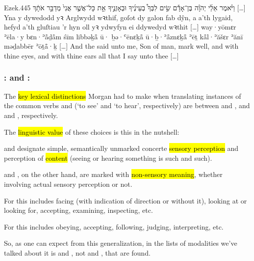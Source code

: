 \begin{example}{Ezek.}{44}{5}{}{}
	\quoling
	{וַיֹּ֨אמֶר אֵלַ֜י יְהֹוָ֗ה בֶּן־אָדָ֡ם שִׂ֣ים לִבְּךָ֩  בְעֵינֶ֜יךָ וּבְאָזְנֶ֣יךָ  אֵ֣ת כָּל־אֲשֶׁ֤ר אֲנִי֙ מְדַבֵּ֣ר אֹתָ֔ךְ […]}
	{Yna y dywedodd yꝛ Arglwydd wꝛthif, goſot dy galon fab dŷn, a  a’th lygaid,  hefyd a’th gluſtiau ’r hyn oll yꝛ ydwyfyn ei ddywedyd wꝛthit […]}
	{way·yōmɛr ʾēla·y {\YHWH} bɛn·ʾå̄ḏå̄m śīm libbəḵå̄ ū· ḇə·ʿēnɛḵå̄ ū·ḇ·ʾå̄znɛḵå̄  ʾēṯ kå̄l·ʾăšɛr ʾănī məḏabbēr ʾōṯå̄·ḵ […]}
	{And the {\LORD} said unto me, Son of man, mark well, and  with thine eyes, and  with thine ears all that I say unto thee […]}
\end{example}



\subsubsection{: and :}

\begin{paper}
	{\click} The \hl{key lexical distinctions} Morgan had to make when translating instances of the common verbs  and  (‘to see’ and ‘to hear’, respectively) are between  and , and  and , respectively.

	{\click} The \hl{linguistic value} of these choices is this in the nutshell:
	\begin{compactitem}
		\item {} and  designate simple, semantically unmarked concerte \hl{sensory perception} and perception of \hl{content} (seeing or hearing something is such and such).%
		\item {} and , on the other hand, are marked with \hl{non-sensory meaning}, whether involving actual sensory perception or not.
			\begin{compactitem}
				\item For  this includes facing (with indication of direction or without it), looking at or looking for, accepting, examining, inspecting, etc.
				\item For  this includes obeying, accepting, following, judging, interpreting, etc.
			\end{compactitem}
	\end{compactitem}

	So, as one can expect from this generalization, in the lists of modalities we’ve talked about it is  and , not  and , that are found.
\end{paper}


